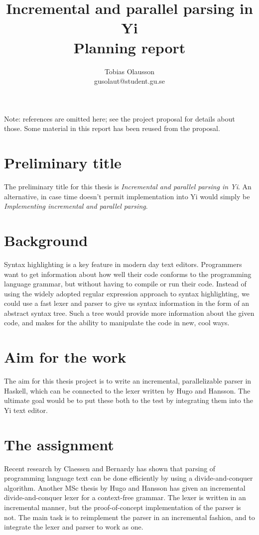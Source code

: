 \documentclass[a4paper,12pt]{article}
\title{Incremental and parallel parsing in Yi \\ 
       \small{Planning report}}
\author{Tobias Olausson \\ \small{gusolaut@student.gu.se}}
\date{}
\begin{document}
\maketitle
Note: references are omitted here; see the project proposal for details about
those. Some material in this report has been reused from the proposal.

\section*{Preliminary title}
The preliminary title for this thesis is \textit{Incremental and parallel
parsing in Yi}. An alternative, in case time doesn't permit implementation into
Yi would simply be \textit{Implementing incremental and parallel parsing}.

\section*{Background}
Syntax highlighting is a key feature in modern day text editors. Programmers
want to get information about how well their code conforms to the programming
language grammar, but without having to compile or run their code. Instead of
using the widely adopted regular expression approach to syntax highlighting, we
could use a fast lexer and parser to give us syntax information in the form of
an abstract syntax tree. Such a tree would provide more information about the
given code, and makes for the ability to manipulate the code in new, cool ways.

\section*{Aim for the work}
The aim for this thesis project is to write an incremental, parallelizable
parser in Haskell, which can be connected to the lexer written by Hugo and
Hansson. The ultimate goal would be to put these both to the test by integrating
them into the Yi text editor.

\section*{The assignment}
Recent research by Claessen and Bernardy has shown that parsing of programming
language text can be done efficiently by using a divide-and-conquer algorithm.
Another MSc thesis by Hugo and Hansson has given an incremental
divide-and-conquer lexer for a context-free grammar. The lexer is written in
an incremental manner, but the proof-of-concept implementation of the parser is
not. The main task is to reimplement the parser in an incremental fashion, and
to integrate the lexer and parser to work as one. 
\end{document}
